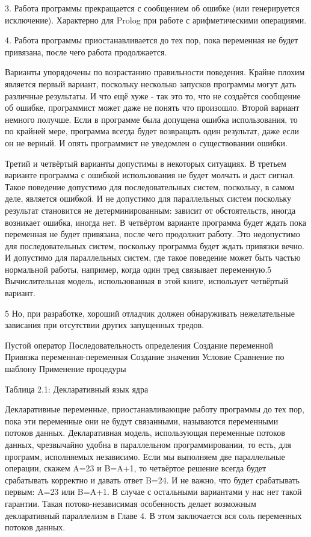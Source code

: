 3. Работа программы прекращается с сообщением об ошибке (или генерируется исключение). Характерно для Prolog при работе с арифметическими операциями.

4. Работа программы приостанавливается до тех пор, пока переменная не будет привязана, после чего работа продолжается.

Варианты упорядочены по возрастанию правильности поведения. Крайне плохим является первый вариант, поскольку несколько запусков программы могут дать различные результаты. И что ещё хуже - так это то, что не создаётся сообщение об ошибке, программист может даже не понять что произошло. Второй вариант немного получше. Если в программе была допущена ошибка использования, то по крайней мере, программа всегда будет возвращать один результат, даже если он не верный. И опять программист не уведомлен о существовании ошибки.

Третий и четвёртый варианты допустимы в некоторых ситуациях. В третьем варианте программа с ошибкой использования не будет молчать и даст сигнал. Такое поведение допустимо для последовательных систем, поскольку, в самом деле, является ошибкой. И не допустимо для параллельных систем поскольку результат становится не детерминированным: зависит от обстоятельств, иногда возникает ошибка, иногда нет. В четвёртом варианте программа будет ждать пока переменная не будет привязана, после чего продолжит работу. Это недопустимо для последовательных систем, поскольку программа будет ждать привязки вечно. И допустимо для параллельных систем, где такое поведение может быть частью нормальной работы, например, когда один тред связывает переменную.5 Вычислительная модель, использованная в этой книге, использует четвёртый вариант.

5 Но, при разработке, хороший отладчик должен обнаруживать нежелательные зависания при отсутствии других запущенных тредов.

Пустой оператор
Последовательность определения
Создание переменной
Привязка переменная-переменная
Создание значения
Условие
Сравнение по шаблону
Применение процедуры

Таблица 2.1: Декларативный язык ядра

Декларативные переменные, приостанавливающие работу программы до тех пор, пока эти переменные они не будут связанными, называются переменными потоков данных. Декларативная модель, использующая переменные потоков данных, чрезвычайно удобна в параллельном программировании, то есть, для программ, исполняемых независимо. Если мы выполняем две параллельные операции, скажем A=23 и B=A+1, то четвёртое решение всегда будет срабатывать корректно и давать ответ B=24. И не важно, что будет срабатывать первым: A=23 или B=A+1. В случае с остальными вариантами у нас нет такой гарантии. Такая потоко-независимая особенность делает возможным декларативный параллелизм в Главе 4. В этом заключается вся соль переменных потоков данных.

